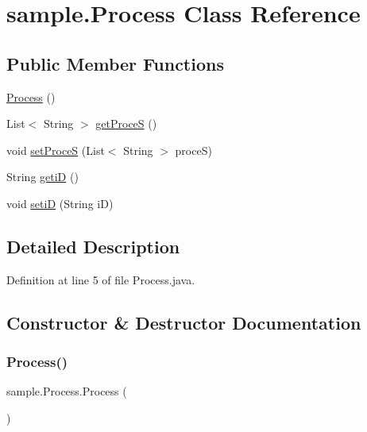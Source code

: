 \hypertarget{classsample_1_1_process}{}\section{sample.\+Process Class Reference}
\label{classsample_1_1_process}
\subsection*{Public Member Functions}
\begin{DoxyCompactItemize}
\item 
\mbox{\hyperlink{classsample_1_1_process_ad5f1721bbcbf557dd821a744d15e134d}{Process}} ()
\item 
List$<$ String $>$ \mbox{\hyperlink{classsample_1_1_process_a08ed9f9e9ea222f188d91fe339bc2624}{get\+ProceS}} ()
\item 
void \mbox{\hyperlink{classsample_1_1_process_af5b5fb495b85597be2e1d64969ed41da}{set\+ProceS}} (List$<$ String $>$ proceS)
\item 
String \mbox{\hyperlink{classsample_1_1_process_a4808903237ff8ca8d836927cbf86edfa}{getiD}} ()
\item 
void \mbox{\hyperlink{classsample_1_1_process_ab95e8303c9e5d8da093a1b0857ed27ca}{setiD}} (String iD)
\end{DoxyCompactItemize}


\subsection{Detailed Description}


Definition at line 5 of file Process.\+java.



\subsection{Constructor \& Destructor Documentation}
\mbox{\label{classsample_1_1_process_ad5f1721bbcbf557dd821a744d15e134d}} 
\subsubsection{\texorpdfstring{Process()}{Process()}}
{\footnotesize\ttfamily sample.\+Process.\+Process (\begin{DoxyParamCaption}{ }\end{DoxyParamCaption})\hspace{0.3cm}{\ttfamily [inline]}}



